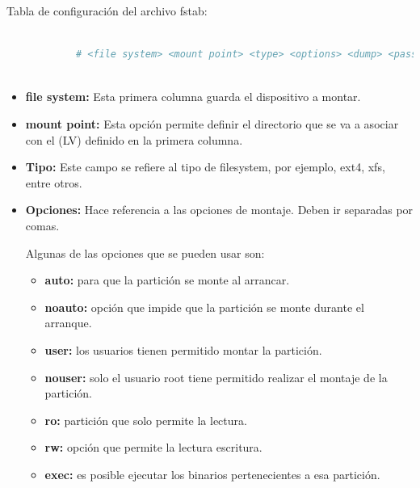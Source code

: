 			Tabla de configuración del archivo fstab: 
			
			\begin{lstlisting}[language=Bash, caption=fstab]
					
			# <file system> <mount point> <type> <options> <dump> <pass>
			
			\end{lstlisting}
			
			\begin{itemize}
				 
				\item \textbf{file system:} Esta primera columna guarda el dispositivo a montar. 
				
				\item \textbf{mount point:}	Esta opción permite definir el directorio que se va a asociar con el (LV) definido en la primera columna. 
				
				\item \textbf{Tipo:} Este campo se refiere al tipo de filesystem, por ejemplo, ext4, xfs, entre otros.
				
				\item \textbf{Opciones:} Hace referencia a las opciones de montaje. Deben ir separadas por comas. 
				
				Algunas de las opciones que se pueden usar son:
				
				\begin{itemize}
				 	
					\item \textbf{auto:} para que la partición se monte al arrancar.
					
					\item \textbf{noauto:} opción que impide que la partición se monte durante el arranque.
					
					\item \textbf{user:} los usuarios tienen permitido montar la partición.
					
					\item \textbf{nouser:} solo el usuario root tiene permitido realizar el montaje de la partición.
					
					\item \textbf{ro:} partición que solo permite la lectura.
					
					\item \textbf{rw:} opción que permite la lectura escritura.
					
					\item \textbf{exec:} es posible ejecutar los binarios pertenecientes a esa partición.
					

\end{itemize}
\end{itemize}
